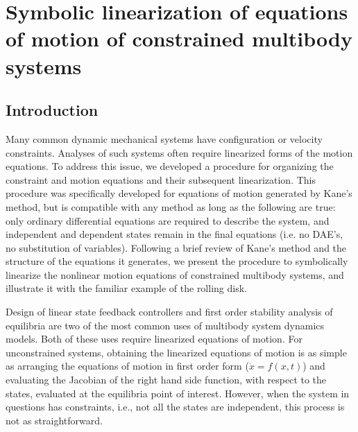 \chapter{Symbolic linearization of equations of motion of constrained multibody
systems} \label{chapter3}
\section{Introduction}
\label{sec:intro}

Many common dynamic mechanical systems have configuration or velocity
constraints.  Analyses of such systems often require linearized forms of the
motion equations.  To address this issue, we developed a procedure for
organizing the constraint and motion equations and their subsequent
linearization.  This procedure was specifically developed for equations of
motion generated by Kane's method, but is compatible with any method as long as
the following are true: only ordinary differential equations are required to
describe the system, and independent and dependent states remain in the final
equations (i.e. no DAE's, no substitution of variables).  Following a brief
review of Kane's method and the structure of the equations it generates, we
present the procedure to symbolically linearize the nonlinear motion equations
of constrained multibody systems, and illustrate it with the familiar example
of the rolling disk.

Design of linear state feedback controllers and first order stability analysis
of equilibria are two of the most common uses of multibody system dynamics
models. Both of these uses require linearized equations of motion. For
unconstrained systems, obtaining the linearized equations of motion is as
simple as arranging the equations of motion in first order form ($\dot{x} =
f(x, t)$) and evaluating the Jacobian of the right hand side function, with
respect to the states, evaluated at the equilibria point of interest.  However,
when the system in questions has constraints, i.e., not all the states are
independent, this process is not as straightforward.

